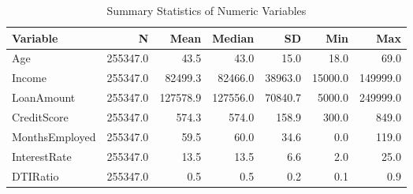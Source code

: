 \begin{table}[H]\centering
\caption{Summary Statistics of Numeric Variables}
\label{Table 2:summary_stats}
\begin{tabular}{lrrrrrr}
\toprule
Variable & N & Mean & Median & SD & Min & Max \\
\midrule
Age & 255347.0 & 43.5 & 43.0 & 15.0 & 18.0 & 69.0 \\
Income & 255347.0 & 82499.3 & 82466.0 & 38963.0 & 15000.0 & 149999.0 \\
LoanAmount & 255347.0 & 127578.9 & 127556.0 & 70840.7 & 5000.0 & 249999.0 \\
CreditScore & 255347.0 & 574.3 & 574.0 & 158.9 & 300.0 & 849.0 \\
MonthsEmployed & 255347.0 & 59.5 & 60.0 & 34.6 & 0.0 & 119.0 \\
InterestRate & 255347.0 & 13.5 & 13.5 & 6.6 & 2.0 & 25.0 \\
DTIRatio & 255347.0 & 0.5 & 0.5 & 0.2 & 0.1 & 0.9 \\
\bottomrule
\end{tabular}
\end{table}
